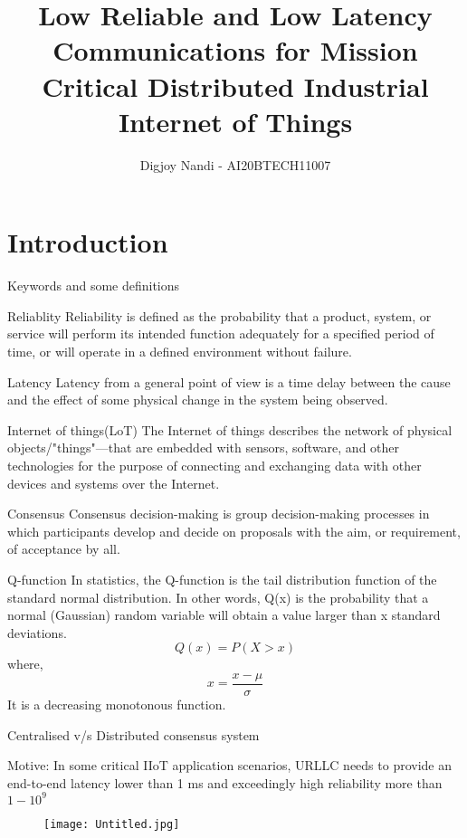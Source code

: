 \documentclass{beamer}
\title{Low Reliable and Low Latency Communications for Mission Critical Distributed Industrial Internet of Things}
\author{Digjoy Nandi - AI20BTECH11007}
\begin{document}
\begin{frame}
\titlepage
\end{frame}
\section{Introduction}
\begin{frame}{Keywords and some definitions}
\begin{block}{Reliablity}
  Reliability is defined as the probability that a product, system, or service will perform its intended function adequately for a specified period of time, or will operate in a defined environment without failure.
\end{block}
    \begin{block}{Latency}
   Latency from a general point of view is a time delay between the cause and the effect of some physical change in the system being observed.
    \end{block}
    \begin{block}{Internet of things(LoT)}
     The Internet of things describes the network of physical objects/"things"—that are embedded with sensors, software, and other technologies for the purpose of connecting and exchanging data with other devices and systems over the Internet.
    \end{block}

\end{frame}
\begin{frame}{}
\begin{block}{Consensus}
    Consensus decision-making is group decision-making processes in which participants develop and decide on proposals with the aim, or requirement, of acceptance by all.

\end{block}
\begin{block}{Q-function}
    In statistics, the Q-function is the tail distribution function of the standard normal distribution. In other words, Q(x) is the probability that a normal (Gaussian) random variable will obtain a value larger than x standard deviations.
    \begin{equation}
        Q(x)=P(X>x)
    \end{equation}
    where, $$x=\frac{x-\mu}{\sigma}$$
    It is a decreasing monotonous function.

\end{block}

\end{frame}
\begin{frame}{Centralised v/s Distributed consensus system}
\begin{block}{Motive:}
In some critical IIoT application scenarios, URLLC needs to provide an end-to-end latency lower than 1 ms and exceedingly high reliability more than$ 1-10^9$

\end{block}
\begin{figure}
    \centering
    \texttt{[image: Untitled.jpg]}
\end{figure}
\end{frame}
\end{document}
